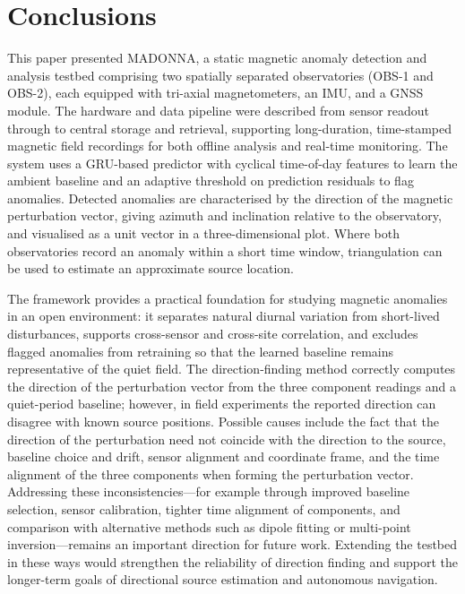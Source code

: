 
\section{Conclusions}

This paper presented MADONNA, a static magnetic anomaly detection and analysis testbed comprising two spatially separated observatories (OBS-1 and OBS-2), each equipped with tri-axial magnetometers, an IMU, and a GNSS module. The hardware and data pipeline were described from sensor readout through to central storage and retrieval, supporting long-duration, time-stamped magnetic field recordings for both offline analysis and real-time monitoring. The system uses a GRU-based predictor with cyclical time-of-day features to learn the ambient baseline and an adaptive threshold on prediction residuals to flag anomalies. Detected anomalies are characterised by the direction of the magnetic perturbation vector, giving azimuth and inclination relative to the observatory, and visualised as a unit vector in a three-dimensional plot. Where both observatories record an anomaly within a short time window, triangulation can be used to estimate an approximate source location.

The framework provides a practical foundation for studying magnetic anomalies in an open environment: it separates natural diurnal variation from short-lived disturbances, supports cross-sensor and cross-site correlation, and excludes flagged anomalies from retraining so that the learned baseline remains representative of the quiet field. The direction-finding method correctly computes the direction of the perturbation vector from the three component readings and a quiet-period baseline; however, in field experiments the reported direction can disagree with known source positions. Possible causes include the fact that the direction of the perturbation need not coincide with the direction to the source, baseline choice and drift, sensor alignment and coordinate frame, and the time alignment of the three components when forming the perturbation vector. Addressing these inconsistencies—for example through improved baseline selection, sensor calibration, tighter time alignment of components, and comparison with alternative methods such as dipole fitting or multi-point inversion—remains an important direction for future work. Extending the testbed in these ways would strengthen the reliability of direction finding and support the longer-term goals of directional source estimation and autonomous navigation.
